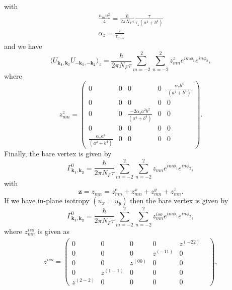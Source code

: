 \documentclass[aps,prb,amsmath,amssymb,footinbib,showpacs,twocolumn]{revtex4-2}
\begin{document}
\begin{widetext}
   with
\begin{align}
      \frac{n_{m}u_{z}^{2}}{4}=  \frac{\hbar}{2\pi N_{F}\tau}\frac{\tau}{\tau_{z}(a^{4}+b^{4})} \\
    \alpha_{z}= \frac{\tau}{\tau_{m,z}}
\end{align}
and we have
\begin{equation}
    \langle U_{\mathbf{k_1},\mathbf{k}_{2}}U_{\mathbf{-k_1},\mathbf{-k_2}}\bigl \rangle_{z}=\frac{\hbar}{2\pi N_{F}\tau}\sum_{m=-2}^{2}\sum_{n=-2}^{2}z^{z}_{mn}e^{im\phi_{1}}e^{in\phi_{2}},
\end{equation}
where
\begin{equation}
      z^{z}_{mn}=  \begin{pmatrix}
     0 & 0 & 0 & 0 & \frac{\alpha_{z}b^{4}}{(a^{4}+b^{4})}\\
        0 & 0 & 0 & 0 & 0 \\
        0 & 0 & \frac{-2\alpha_{z}a^{2}b^{2}}{(a^{4}+b^{4})} & 0 & 0 \\
        0 & 0 & 0 & 0 & 0\\
       \frac{\alpha_{z}a^{4}}{(a^{4}+b^{4})} & 0 & 0 & 0 & 0
\end{pmatrix}.
\end{equation}
Finally, the bare vertex  is given by
\begin{equation}
\Gamma^{0}_{\mathbf{k_{1},k_{2}}}=\frac{\hbar}{2\pi N_{F}\tau}\sum_{m=-2}^{2}\sum_{n=-2}^{2}z_{mn}e^{im\phi_{1}}e^{in\phi_{2}},
\end{equation}
with
\begin{equation}
    \mathbf{z}=z_{mn} =z^{e}_{mn}+z^{x}_{mn}+z^{y}_{mn}+z^{z}_{mn}.
\end{equation}
If we have in-plane isotropy $(u_{x} = u_{y})$ then the bare vertex is given by
\begin{equation}
   \Gamma^{0}_{\mathbf{k_{1},k_{2}}}=\frac{\hbar}{2\pi N_{F}\tau}\sum_{m=-2}^{2}\sum_{n=-2}^{2}z^{iso}_{mn}e^{im\phi_{1}}e^{in\phi_{2}}, 
\end{equation}
where $z^{iso}_{mn}$ is given as
\begin{align}
     z^{iso}= 
    \begin{pmatrix}
    0 & 0 & 0 & 0 & z^{(-22)}\\
     0 & 0 & 0 & z^{(-11)} & 0 \\
      0 & 0 & z^{(00)} & 0 & 0 \\
      0 & z^{(1-1)} & 0 & 0 & 0 \\
      z^{(2-2)} & 0 & 0 & 0 & 0 &
    \end{pmatrix},

\end{align}
\end{widetext}
\end{document}
